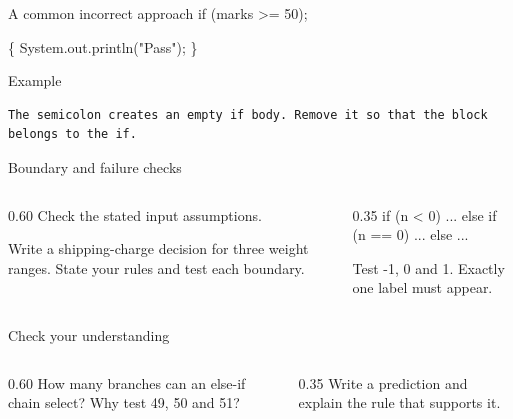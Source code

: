 \documentclass[10pt,aspectratio=169]{beamer}
\begin{document}
\begin{frame}[fragile,t]{A common incorrect approach}
if (marks \textgreater{}= 50);\par \{ System.out.println("Pass"); \}
\vspace{1mm}\begin{block}{Example}
\begin{lstlisting}
The semicolon creates an empty if body. Remove it so that the block belongs to the if.
\end{lstlisting}
\end{block}
\end{frame}

\begin{frame}[fragile,t]{Boundary and failure checks}
\begin{columns}[T,onlytextwidth]\begin{column}{0.60\textwidth}
Check the stated input assumptions.

Write a shipping-charge decision for three weight ranges. State your rules and test each boundary.
\end{column}\begin{column}{0.35\textwidth}\small
if (n \textless{} 0) ... else if (n == 0) ... else ...\par Test -1, 0 and 1. Exactly one label must appear.
\end{column}\end{columns}
\end{frame}

\begin{frame}[fragile,t]{Check your understanding}
\begin{columns}[T,onlytextwidth]\begin{column}{0.60\textwidth}
How many branches can an else-if chain select? Why test 49, 50 and 51?
\end{column}\begin{column}{0.35\textwidth}\small
Write a prediction and explain the rule that supports it.
\end{column}\end{columns}
\end{frame}
\end{document}
